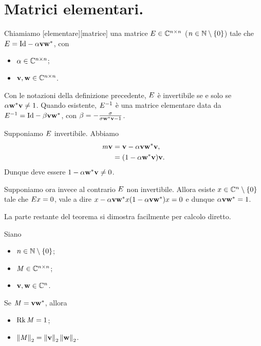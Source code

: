 \section{Matrici elementari.}
\label{MetodiNumericiPerLaRisoluzioneDiSistemiLineari_MatriciElementari}
\begin{Definition}
  Chiamiamo
  [elementare][matrice]
  una matrice
  $E \in \mathbb{C}^{n \times n}$ ($n \in \mathbb{N} \setminus \lbrace 0 \rbrace$)
  tale che
  $\ElementaryMatrix
  = \Identity - \Scalar\Vector\HermitianTransposed{\VarVector}$, con
  \begin{itemize}
    \item $\alpha \in \mathbb{C}^{n \times n}$;
    \item $\mathbf{v}, \mathbf{w} \in \mathbb{C}^{n \times n}$.
  \end{itemize}
\end{Definition}
\begin{Theorem}
  Con le notazioni della definizione precedente, $E$ \`e
  invertibile se e solo se
  $\alpha{\mathbf{w}}^*\mathbf{v} \neq 1$.
  Quando esistente, $E^{-1}$ \`e una matrice elementare data da
  $\ElementaryMatrix^{-1}
  = \Identity - \VarScalar\Vector\HermitianTransposed{\VarVector}$, con
  $\beta
  = - \frac{\sigma}{\sigma{\mathbf{w}}^*\mathbf{v} - 1}$.
\end{Theorem}
\Proof Supponiamo $E$ invertibile. Abbiamo
\begin{align*}
  \mathit{m}\mathbf{v}
  &= \mathbf{v} - \alpha\mathbf{v}{\mathbf{w}}^*\mathbf{v},\\
  &= (1 - \alpha{\mathbf{w}}^*\mathbf{v})\mathbf{v}.
\end{align*}
Dunque deve essere $1 - \alpha{\mathbf{w}}^*\mathbf{v} \neq 0$.
\par Supponiamo ora invece al contrario $E$ non invertibile.
Allora esiste $x \in \mathbb{C}^n \setminus \lbrace 0 \rbrace$ tale che $E x = 0$,
vale a dire
$x - \alpha\mathbf{v}{\mathbf{w}}^* x
(1 - \alpha\mathbf{v}{\mathbf{w}}^*) x
= 0$
e dunque
$\alpha\mathbf{v}{\mathbf{w}}^* = 1$.
\par La parte restante del teorema si dimostra facilmente per calcolo diretto.
\EndProof
\begin{Lemma}
  \label{MetodiNumericiPerLaRisoluzioneDiSistemiLineari_LemmaRango1}
  Siano
  \begin{itemize}
    \item $n \in \mathbb{N} \setminus \lbrace 0 \rbrace$;
    \item $\mathit{M} \in \mathbb{C}^{n \times n}$;
    \item $\mathbf{v}, \mathbf{w} \in \mathbb{C}^n$.
  \end{itemize}
  Se
  $\mathit{M} = \mathbf{v}{\mathbf{w}}^*$,
  allora
  \begin{itemize}
    \item $\operatorname{Rk}{\mathit{M}} = 1$;
    \item $\Norm{\Matrix}[2] = \Norm{\Vector}[2] \Norm{\VarVector}[2]$.
  \end{itemize}
\end{Lemma}
